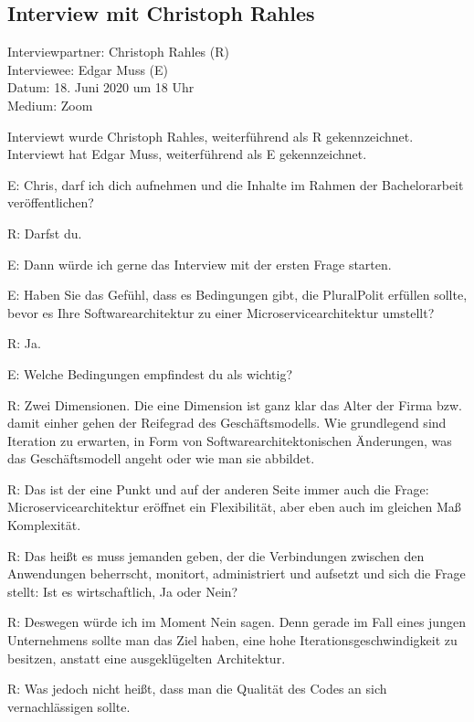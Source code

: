 \subsection{Interview mit Christoph Rahles}
\label{appendix:rahles}

Interviewpartner: Christoph Rahles (R) \\
Interviewee: Edgar Muss (E) \\
Datum: 18. Juni 2020 um 18 Uhr \\
Medium: Zoom

Interviewt wurde Christoph Rahles, weiterführend als R gekennzeichnet. Interviewt hat Edgar Muss, weiterführend als E gekennzeichnet.

E: Chris, darf ich dich aufnehmen und die Inhalte im Rahmen der Bachelorarbeit veröffentlichen?

R: Darfst du.

E: Dann würde ich gerne das Interview mit der ersten Frage starten.

E: Haben Sie das Gefühl, dass es Bedingungen gibt, die PluralPolit erfüllen sollte, bevor es Ihre Softwarearchitektur zu einer Microservicearchitektur umstellt?

R: Ja.

E: Welche Bedingungen empfindest du als wichtig?

\label{appendix:r-1}
R: Zwei Dimensionen. Die eine Dimension ist ganz klar das Alter der Firma bzw. damit einher gehen der Reifegrad des Geschäftsmodells. Wie grundlegend sind Iteration zu erwarten, in Form von Softwarearchitektonischen Änderungen, was das Geschäftsmodell angeht oder wie man sie abbildet.

\label{appendix:r-2}
R: Das ist der eine Punkt und auf der anderen Seite immer auch die Frage: Microservicearchitektur eröffnet ein Flexibilität, aber eben auch im gleichen Maß Komplexität.

\label{appendix:r-3}
R: Das heißt es muss  jemanden geben, der die Verbindungen zwischen den Anwendungen beherrscht, monitort, administriert und aufsetzt und sich die Frage stellt: Ist es wirtschaftlich, Ja oder Nein?

\label{appendix:r-4}
R: Deswegen würde ich im Moment Nein sagen. Denn gerade im Fall eines jungen Unternehmens sollte man das Ziel haben, eine hohe Iterationsgeschwindigkeit zu besitzen, anstatt eine ausgeklügelten Architektur.

\label{appendix:r-5}
R: Was jedoch nicht heißt, dass man die Qualität des Codes an sich vernachlässigen sollte.

